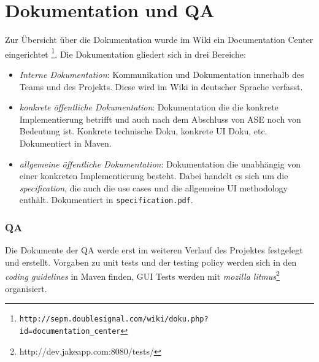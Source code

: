 \section{Dokumentation und QA}
Zur Übersicht über die Dokumentation wurde im Wiki ein Documentation Center eingerichtet \footnote{\texttt{http://sepm.doublesignal.com/wiki/doku.php?id=documentation\_center}}. Die Dokumentation gliedert sich in drei Bereiche:
\begin{itemize}
\item \emph{Interne Dokumentation}: Kommunikation und Dokumentation innerhalb des Teams und des Projekts. Diese wird im Wiki in deutscher Sprache verfasst.
\item \emph{konkrete öffentliche Dokumentation}: Dokumentation die die konkrete Implementierung betrifft und auch nach dem Abschluss von ASE noch von Bedeutung ist. Konkrete technische Doku, konkrete UI Doku, etc. Dokumentiert in Maven.
\item \emph{allgemeine öffentliche Dokumentation}: Dokumentation die unabhängig von einer konkreten Implementierung besteht. Dabei handelt es sich um die \emph{specification}, die auch die use cases und die allgemeine UI methodology enthält. Dokumentiert in \texttt{specification.pdf}. 
\end{itemize}

\subsubsection{QA}
Die Dokumente der QA werde erst im weiteren Verlauf des Projektes festgelegt und erstellt. Vorgaben zu unit tests und der testing policy werden sich in den \emph{coding guidelines} in Maven finden, GUI Tests werden mit \emph{mozilla litmus}\footnote{http://dev.jakeapp.com:8080/tests/} organisiert. 